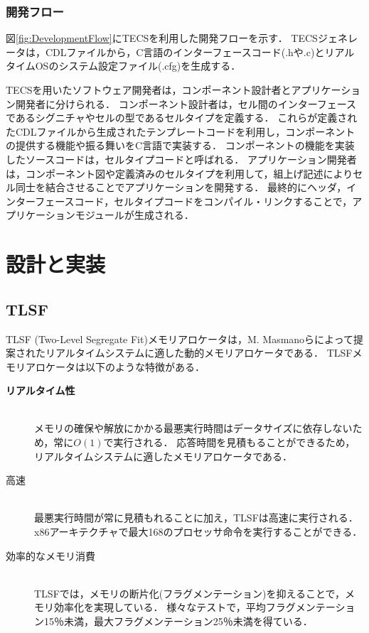 \documentclass[submit,techrep]{ipsj_v2/UTF8/ipsj}
\begin{document}
\subsubsection{開発フロー}

図\ref{fig:DevelopmentFlow}にTECSを利用した開発フローを示す．
TECSジェネレータは，CDLファイルから，C言語のインターフェースコード(.hや.c)とリアルタイムOSのシステム設定ファイル(.cfg)を生成する．

TECSを用いたソフトウェア開発者は，コンポーネント設計者とアプリケーション開発者に分けられる．
コンポーネント設計者は，セル間のインターフェースであるシグニチャやセルの型であるセルタイプを定義する．
これらが定義されたCDLファイルから生成されたテンプレートコードを利用し，コンポーネントの提供する機能や振る舞いをC言語で実装する．
コンポーネントの機能を実装したソースコードは，セルタイプコードと呼ばれる．
アプリケーション開発者は，コンポーネント図や定義済みのセルタイプを利用して，組上げ記述によりセル同士を結合させることでアプリケーションを開発する．
最終的にヘッダ，インターフェースコード，セルタイプコードをコンパイル・リンクすることで，アプリケーションモジュールが生成される．



\section{設計と実装}
\label{sec:DesignImplementation}


\subsection{TLSF}
\label{sec:TLSF}
TLSF (Two-Level Segregate Fit)メモリアロケータは，M. Masmanoらによって提案されたリアルタイムシステムに適した動的メモリアロケータである．
TLSFメモリアロケータは以下のような特徴がある．
\begin{description}
    \item[{\bf リアルタイム性}]\mbox{}\\
        メモリの確保や解放にかかる最悪実行時間はデータサイズに依存しないため，常に$O(1)$で実行される．
        応答時間を見積もることができるため，リアルタイムシステムに適したメモリアロケータである．
    \item[{高速}]\mbox{}\\
        最悪実行時間が常に見積もれることに加え，TLSFは高速に実行される．
        x86アーキテクチャで最大168のプロセッサ命令を実行することができる．
    \item[{効率的なメモリ消費}]\mbox{}\\
        TLSFでは，メモリの断片化(フラグメンテーション)を抑えることで，メモリ効率化を実現している．
        様々なテストで，平均フラグメンテーション15％未満，最大フラグメンテーション25％未満を得ている．
\end{description}
\end{document}
